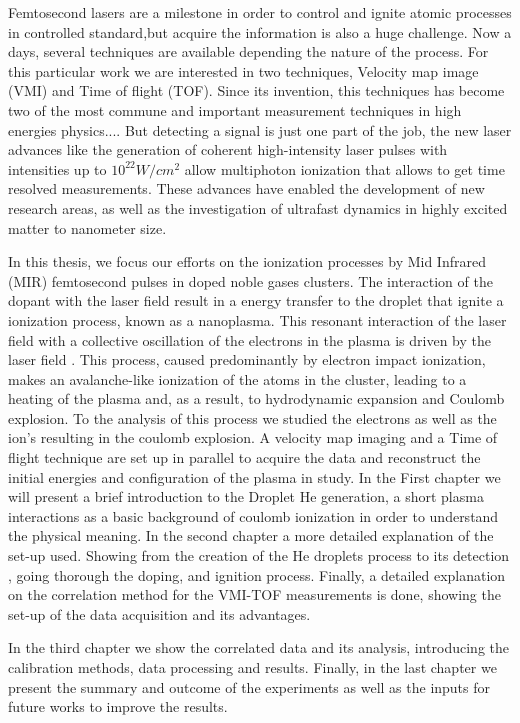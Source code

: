 Femtosecond lasers are a milestone in order to control and ignite atomic processes in controlled standard,but  acquire the information is also a huge challenge. Now a days, several techniques are available  depending the nature of the process. For this particular  work we are interested in two  techniques, Velocity map image (VMI) and Time of flight (TOF).
Since its invention, this techniques  has become two of the most commune and important measurement techniques in high energies physics....
But detecting a signal is just one part of the job, the new laser advances like the  generation of coherent high-intensity laser pulses with intensities up to $10^{22} W/cm^{2}$  allow multiphoton ionization that allows to get time resolved measurements. These advances have enabled the development of new research areas, as well as the investigation of ultrafast dynamics in highly excited matter to nanometer size.

In this thesis, we focus our efforts on the ionization processes by Mid Infrared (MIR) femtosecond pulses in doped noble gases clusters. The interaction of the dopant with the laser field result in a energy transfer to the droplet that ignite a ionization process, known as a nanoplasma. This resonant interaction of the laser field with a collective oscillation of the electrons in the plasma is driven by the laser field \cite{fennel_laser-driven_2010}. This process, caused predominantly by electron impact ionization, makes an avalanche-like ionization of the atoms in the cluster, leading to a heating of the plasma and, as a result, to hydrodynamic expansion and Coulomb explosion. To the analysis of this process we studied the electrons as well as the ion's resulting in the coulomb explosion. A velocity map imaging and a Time of flight technique are set up in parallel to acquire the data and reconstruct the initial energies and configuration of the plasma in study. 
In the First chapter we will present a brief introduction to the Droplet He generation, a short plasma interactions as a basic background of coulomb ionization in order to understand the physical meaning.
In the second chapter a more detailed explanation of the set-up used. Showing from the creation of the He droplets process to its detection , going thorough the doping, and ignition process. Finally, a detailed explanation on the correlation method for the VMI-TOF measurements is done, showing the set-up of the data acquisition and its advantages.

In the third chapter we show the correlated data and its analysis, introducing the calibration methods, data processing and results. Finally, in the last chapter we present the summary and outcome of the experiments as well as the inputs for future works to improve the results.

